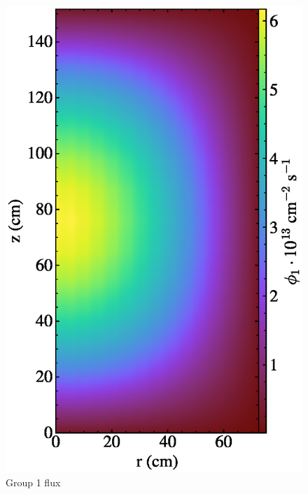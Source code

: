 \documentclass{article}
\begin{document}
\begin{figure}
  \centering
  \includegraphics{auto_diff_rho_group1.eps}
  \caption{Group 1 flux}
  \label{fig:group1}
\end{figure}
\end{document}
